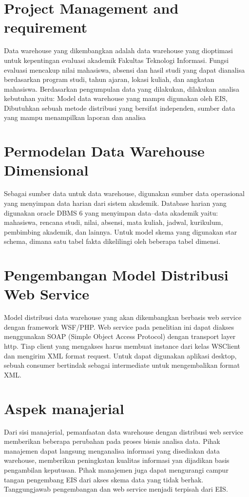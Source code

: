 \section{Project Management and requirement}
Data warehouse yang dikembangkan adalah data warehouse yang dioptimasi untuk kepentingan evaluasi akademik Fakultas Teknologi Informasi. Fungsi evaluasi mencakup nilai mahasiswa, absensi dan hasil studi yang dapat dianalisa berdasarkan program studi, tahun ajaran, lokasi kuliah, dan angkatan mahasiswa. Berdasarkan pengumpulan data yang dilakukan, dilakukan analisa kebutuhan yaitu: Model data warehouse yang mampu digunakan oleh EIS, Dibutuhkan sebuah metode distribusi yang bersifat independen, sumber data yang mampu menampilkan laporan dan analisa


\section{Permodelan Data Warehouse Dimensional}
Sebagai sumber data untuk data warehouse, digunakan sumber data operasional yang menyimpan data harian dari sistem akademik. Database harian yang digunakan  oracle DBMS 6 yang menyimpan data–data akademik yaitu: mahasiswa, rencana studi, nilai, absensi, mata kuliah, jadwal, kurikulum, pembimbing akademik, dan lainnya. Untuk model skema yang digunakan star schema, dimana satu tabel fakta dikelilingi oleh beberapa tabel dimensi. 


\section{Pengembangan Model Distribusi Web Service}
Model distribusi data warehouse yang akan dikembangkan berbasis web service dengan framework WSF/PHP.    
Web service pada penelitian ini dapat diakses menggunakan SOAP (Simple Object Access Protocol) dengan transport layer http. 
Tiap client yang mengakses harus membuat instance dari kelas WSClient dan mengirim XML format request. 
Untuk dapat digunakan aplikasi desktop, sebuah consumer bertindak sebagai intermediate untuk mengembalikan format XML.


\section{Aspek manajerial}
Dari sisi manajerial, pemanfaatan data warehouse dengan distribusi web service
memberikan beberapa perubahan pada proses bisnis analisa data. Pihak manajemen
dapat langsung menganalisa informasi yang disediakan data warehouse, memberikan
peningkatan kualitas informasi yan dijadikan basis pengambilan keputusan. Pihak manajemen juga dapat mengurangi
campur tangan pengembang EIS dari akses skema data yang tidak berhak. Tanggungjawab pengembangan dan web service
menjadi terpisah dari EIS. 


